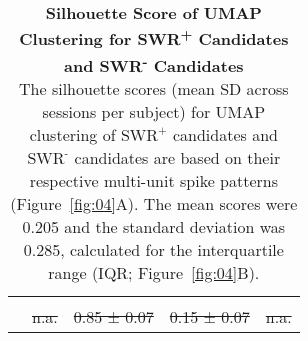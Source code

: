 \documentclass[preprint,review,12pt]{elsarticle}%
\providecommand{\DIFaddtex}[1]{{\protect\color{blue}\uwave{#1}}} %
\providecommand{\DIFdeltex}[1]{{\protect\color{red}\sout{#1}}}                      %
\providecommand{\DIFaddbegin}{} %
\providecommand{\DIFaddend}{} %
\providecommand{\DIFdelend}{} %
\providecommand{\DIFaddFL}[1]{\DIFadd{#1}} %
\providecommand{\DIFdelFL}[1]{\DIFdel{#1}} %
\providecommand{\DIFaddbeginFL}{} %
\providecommand{\DIFaddendFL}{} %
\providecommand{\DIFdelbeginFL}{} %
\providecommand{\DIFdelendFL}{} %
\providecommand{\DIFadd}[1]{\texorpdfstring{\DIFaddtex{#1}}{#1}} %
\providecommand{\DIFdel}[1]{\texorpdfstring{\DIFdeltex{#1}}{}} %
\newcommand{\DIFscaledelfig}{0.5}
\newlength{\DIFdelgraphicswidth} %
\newlength{\DIFdelgraphicsheight} %
\newcommand{\DIFaddincludegraphics}[2][]{{\color{blue}\fbox{\DIFOincludegraphics[#1]{#2}}}} %
\newcommand{\DIFdelincludegraphics}[2][]{%
\sbox{\DIFdelgraphicsbox}{\DIFOincludegraphics[#1]{#2}}%
\settoboxwidth{\DIFdelgraphicswidth}{\DIFdelgraphicsbox} %
\settoboxtotalheight{\DIFdelgraphicsheight}{\DIFdelgraphicsbox} %
\scalebox{\DIFscaledelfig}{%
\parbox[b]{\DIFdelgraphicswidth}{\usebox{\DIFdelgraphicsbox}\\[-\baselineskip] \rule{\DIFdelgraphicswidth}{0em}}\llap{\resizebox{\DIFdelgraphicswidth}{\DIFdelgraphicsheight}{%
\setlength{\unitlength}{\DIFdelgraphicswidth}%
\begin{picture}(1,1)%
\thicklines\linethickness{2pt} %
{\color[rgb]{1,0,0}\put(0,0){\framebox(1,1){}}}%
{\color[rgb]{1,0,0}\put(0,0){\line( 1,1){1}}}%
{\color[rgb]{1,0,0}\put(0,1){\line(1,-1){1}}}%
\end{picture}%
}\hspace*{3pt}}} %
} %
\DeclareRobustCommand{\DIFaddbegin}{\DIFOaddbegin \let\includegraphics\DIFaddincludegraphics} %
\DeclareRobustCommand{\DIFaddend}{\DIFOaddend \let\includegraphics\DIFOincludegraphics} %
\DeclareRobustCommand{\DIFdelend}{\DIFOaddend \let\includegraphics\DIFOincludegraphics} %
\DeclareRobustCommand{\DIFaddbeginFL}{\DIFOaddbeginFL \let\includegraphics\DIFaddincludegraphics} %
\DeclareRobustCommand{\DIFaddendFL}{\DIFOaddendFL \let\includegraphics\DIFOincludegraphics} %
\DeclareRobustCommand{\DIFdelbeginFL}{\DIFOdelbeginFL \let\includegraphics\DIFdelincludegraphics} %
\DeclareRobustCommand{\DIFdelendFL}{\DIFOaddendFL \let\includegraphics\DIFOincludegraphics} %
\begin{document}
\begin{table}[htbp]
\begin{tabular}{*{5}{r}}
{}\DIFdelendFL \DIFaddbeginFL \DIFaddFL{$\mathrm{n.a.}$}\DIFaddendFL \\
\DIFdelbeginFL \DIFdelFL{#9 }\DIFdelendFL \DIFaddbeginFL \DIFaddFL{$\mathrm{\#9}$ }\DIFaddendFL & \DIFdelbeginFL \DIFdelFL{n.a. }\DIFdelendFL \DIFaddbeginFL \DIFaddFL{$\mathrm{n.a.}$ }\DIFaddendFL & \DIFdelbeginFL \DIFdelFL{0.85 ± 0.07 }\DIFdelendFL \DIFaddbeginFL \DIFaddFL{$\mathrm{0.85\ \pm\ 0.07}$ }\DIFaddendFL & \DIFdelbeginFL \DIFdelFL{0.15 ± 0.07 }\DIFdelendFL \DIFaddbeginFL \DIFaddFL{$\mathrm{0.15\ \pm\ 0.07}$ }\DIFaddendFL & \DIFdelbeginFL \DIFdelFL{n.a.
}\DIFdelendFL \DIFaddbeginFL \DIFaddFL{$\mathrm{n.a.}$}\DIFaddendFL \\
\bottomrule
\end{tabular}
\captionsetup{width=\textwidth}
\caption{\textbf{Silhouette Score of UMAP Clustering for SWR\textsuperscript{+} Candidates and SWR\textsuperscript{-} Candidates}
\smallskip
\\
The silhouette scores (mean \textpm SD across sessions per subject) for UMAP clustering of $\text{SWR}^\text{+}$ candidates and $\text{SWR}^\text{-}$ candidates are based on their respective multi-unit spike patterns (Figure~\ref{fig:04}A). The mean scores were 0.205 and the standard deviation was 0.285, calculated for the interquartile range (IQR; Figure~\ref{fig:04}B).}
\DIFdelbeginFL %
\DIFdelend %
\DIFaddbegin \end{table}

\DIFaddend \restoregeometry
\DIFaddbegin 
\end{document}
